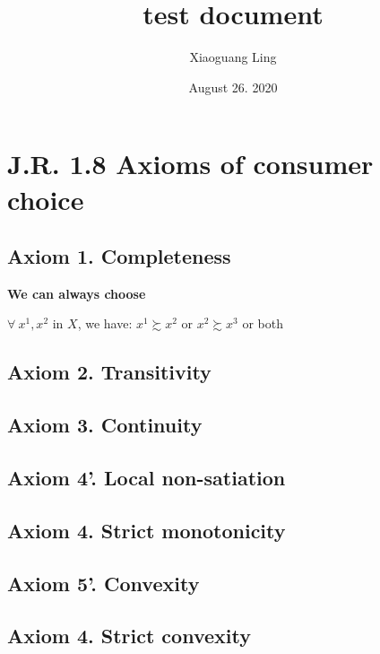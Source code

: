 \documentclass{article}
\title{test document}
\author{Xiaoguang Ling }
\date{August 26. 2020}
\begin{document}
\maketitle

\section{J.R. 1.8 Axioms of consumer choice}

\subsection{Axiom 1. Completeness}
\textbf{We can always choose}

$\forall \ x^1, x^2$ in $X$, we have: $x^1 \succsim  x^2$ or $x^2 \succsim  x^3$  or both

\subsection{Axiom 2. Transitivity}


\subsection{Axiom 3. Continuity}


\subsection{Axiom 4'. Local non-satiation}

\subsection{Axiom 4. Strict monotonicity}

\subsection{Axiom 5'. Convexity}

\subsection{Axiom 4. Strict convexity}
\end{document}
